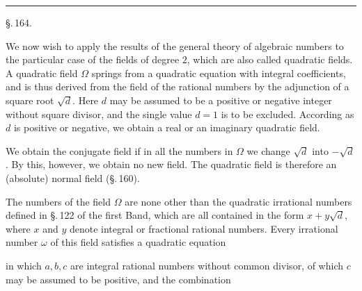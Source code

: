 \begin{center}

\end{center}

\begin{center}
\rule{0.2\linewidth}{0.4pt}
\end{center}

\begin{center}
\S.\,164.

\end{center}

We now wish to apply the results of the general theory of algebraic numbers to the particular case of the fields of degree $2$,
which are also called quadratic fields. A quadratic field $\Omega$
springs from a quadratic equation with integral coefficients, and is
thus derived from the field of the rational numbers by the adjunction
of a square root $\sqrt{d}$. Here $d$ may be assumed to be a positive
or negative integer without square divisor, and the single value
$d = 1$ is to be excluded. According as $d$ is positive or negative,
we obtain a real or an imaginary quadratic field.

We obtain the conjugate field if in all the numbers in $\Omega$ we
change $\sqrt{d}$ into $-\sqrt{d}$. By this, however, we obtain no new
field. The quadratic field is therefore an (absolute) normal field
(\S.\,160).

The numbers of the field $\Omega$ are none other than the quadratic
irrational numbers defined in \S.\,122 of the first Band, which are
all contained in the form $x + y\sqrt{d}$, where $x$ and $y$ denote
integral or fractional rational numbers. Every irrational number
$\omega$ of this field satisfies a quadratic equation


in which $a, b, c$ are integral rational numbers without common
divisor, of which $c$ may be assumed to be positive, and the
combination

